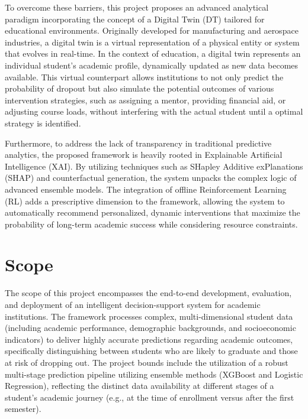 \documentclass[12pt,a4paper]{report}
\begin{document}
To overcome these barriers, this project proposes an advanced analytical paradigm incorporating the concept of a Digital Twin (DT) tailored for educational environments. Originally developed for manufacturing and aerospace industries, a digital twin is a virtual representation of a physical entity or system that evolves in real-time. In the context of education, a digital twin represents an individual student's academic profile, dynamically updated as new data becomes available. This virtual counterpart allows institutions to not only predict the probability of dropout but also simulate the potential outcomes of various intervention strategies, such as assigning a mentor, providing financial aid, or adjusting course loads, without interfering with the actual student until a optimal strategy is identified.

Furthermore, to address the lack of transparency in traditional predictive analytics, the proposed framework is heavily rooted in Explainable Artificial Intelligence (XAI). By utilizing techniques such as SHapley Additive exPlanations (SHAP) and counterfactual generation, the system unpacks the complex logic of advanced ensemble models. The integration of offline Reinforcement Learning (RL) adds a prescriptive dimension to the framework, allowing the system to automatically recommend personalized, dynamic interventions that maximize the probability of long-term academic success while considering resource constraints.

\section{Scope}
The scope of this project encompasses the end-to-end development, evaluation, and deployment of an intelligent decision-support system for academic institutions. The framework processes complex, multi-dimensional student data (including academic performance, demographic backgrounds, and socioeconomic indicators) to deliver highly accurate predictions regarding academic outcomes, specifically distinguishing between students who are likely to graduate and those at risk of dropping out. The project bounds include the utilization of a robust multi-stage prediction pipeline utilizing ensemble methods (XGBoost and Logistic Regression), reflecting the distinct data availability at different stages of a student's academic journey (e.g., at the time of enrollment versus after the first semester).
\end{document}
